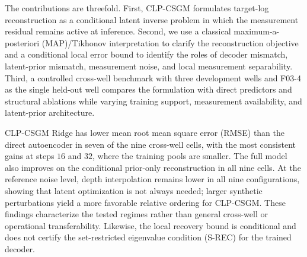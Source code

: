 The contributions are threefold. First, CLP-CSGM formulates target-log
reconstruction as a conditional latent inverse problem in which the
measurement residual remains active at inference. Second, we use a classical
maximum-a-posteriori (MAP)/Tikhonov interpretation to clarify the
reconstruction objective and a conditional local error bound to identify the
roles of decoder mismatch, latent-prior mismatch, measurement noise, and local
measurement separability. Third, a controlled cross-well benchmark with three
development wells and F03-4 as the single held-out well compares the
formulation with direct predictors and structural ablations
while varying training support, measurement availability, and latent-prior
architecture.

CLP-CSGM Ridge has lower mean root mean square error (RMSE) than the direct
autoencoder in seven of the nine cross-well cells, with the most consistent
gains at steps $16$ and $32$, where the training pools are smaller. The full
model also improves on the conditional prior-only reconstruction in all nine
cells. At the reference noise level, depth interpolation remains lower in all
nine configurations, showing that latent optimization is not always needed;
larger synthetic perturbations yield a more favorable relative ordering for
CLP-CSGM. These findings characterize the tested regimes rather than general
cross-well or operational transferability. Likewise, the local recovery
bound is conditional and does not certify the set-restricted eigenvalue
condition (S-REC) for the trained decoder.
